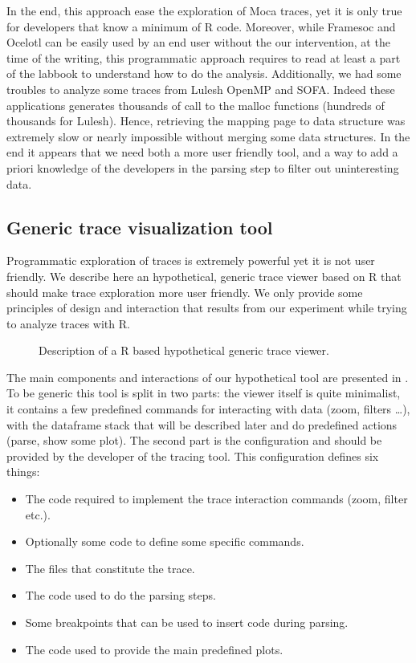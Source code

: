 In the end, this approach ease the exploration of \gls{Moca} traces, yet it is only true for developers that know a minimum of \gls{R} code.
Moreover, while \gls{Framesoc} and \gls{Ocelotl} can be easily used by an end user without the our intervention, at the time of the writing, this programmatic approach requires to read at least a part of the labbook to understand how to do the analysis.
Additionally, we had some troubles to analyze some traces from Lulesh \gls{OpenMP} and \gls{SOFA}.
Indeed these applications generates thousands of call to the malloc functions (hundreds of thousands for Lulesh).
Hence, retrieving the mapping page to data structure was extremely slow or nearly impossible without merging some data structures.
In the end it appears that we need both a more user friendly tool, and a way to add a priori knowledge of the developers in the parsing step to filter out uninteresting data.

\subsection{Generic trace visualization tool}

Programmatic exploration of traces is extremely powerful yet it is not user friendly.
We describe here an hypothetical, generic trace viewer based on \gls{R} that should make trace exploration more user friendly.
We only provide some principles of design and interaction that results from our experiment while trying to analyze traces with \gls{R}.

\begin{figure}[htb]
    \centering
    
    \caption{Description of a R based hypothetical generic trace viewer.}
    \label{fig:generic-viewer}
\end{figure}

The main components and interactions of our hypothetical tool are presented in .
To be generic this tool is split in two parts: the viewer itself is quite minimalist, it contains a few predefined commands for interacting with data (zoom, filters \ldots), with the dataframe stack that will be described later and do predefined actions (parse, show some plot).
The second part is the configuration and should be provided by the developer of the tracing tool.
This configuration defines six things:
\begin{itemize}
    \item The code required to implement the trace interaction commands (zoom, filter etc.).
    \item Optionally some code to define some specific commands.
    \item The files that constitute the trace.
    \item The code used to do the parsing steps.
    \item Some breakpoints that can be used to insert code during parsing.
    \item The code used to provide the main predefined plots.
\end{itemize}


